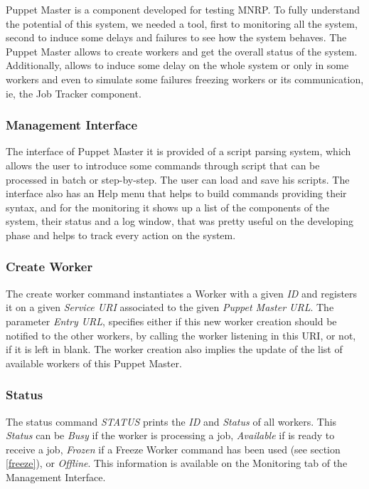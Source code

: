 \documentclass[times, 10pt,twocolumn]{article}
\begin{document}
	      Puppet Master is a component developed for testing \ac{MNRP}. To fully understand the potential of this system, we needed a tool, first to monitoring all the system, second to induce some delays and failures to see how the system behaves. The Puppet Master allows to create workers and get the overall status of the system. Additionally, allows to induce some delay on the whole system or only in some workers and even to simulate some failures freezing workers or its communication, ie, the Job Tracker component.
            \subsubsection{Management Interface}
            The interface of Puppet Master it is provided of a script parsing system, which allows the user to introduce some commands through script that can be processed in batch or step-by-step. The user can load and save his scripts. The interface also has an Help menu that helps to build commands providing their syntax, and for the monitoring it shows up a list of the components of the system, their status and a log window, that was pretty useful on the developing phase and helps to track every action on the system.
            \subsubsection{Create Worker}
            The create worker command instantiates a Worker with a given \emph{ID}
            and registers it on a given \emph{Service URI} associated to the given \emph{Puppet Master URL}.
            The parameter \emph{Entry URL}, specifies either if this new worker creation should be
            notified to the other workers, by calling the worker listening in this URI, or not, if it is left in blank.
            The worker creation also implies the update of the list of available workers of this Puppet Master.
            \subsubsection{Status}

            The status command \emph{STATUS} prints the \emph{ID} and \emph{Status} of all workers.
            This \emph{Status} can be  \emph{Busy} if the worker is processing a job, \emph{Available}
            if is ready to receive a job, \emph{Frozen} if a Freeze Worker command has been used (see section \ref{freeze}), or \emph{Offline}.
            This information is available on the Monitoring tab of the Management Interface.
\end{document}
